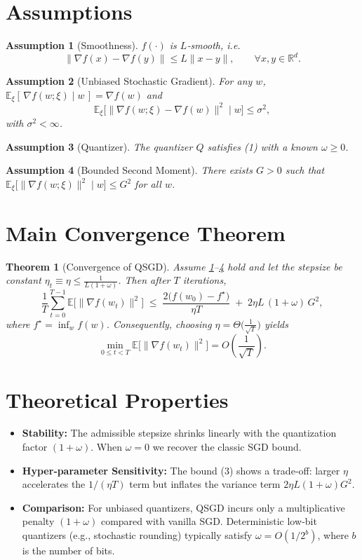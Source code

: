 \documentclass{article}
\newtheorem{theorem}{Theorem}
\newtheorem{assumption}{Assumption}
\newcommand{\EE}{\mathbb{E}}
\newcommand{\RR}{\mathbb{R}}
\begin{document}
\newpage

\section*{Assumptions}
\begin{assumption}[Smoothness]\label{as:smooth}
$f(\cdot)$ is $L$‑smooth, i.e.
\[
\|\nabla f(x)-\nabla f(y)\|\le L\|x-y\|,\qquad\forall x,y\in\RR^{d}.
\tag{A1}
\]
\end{assumption}
\begin{assumption}[Unbiased Stochastic Gradient]\label{as:unbiased}
For any $w$, $\EE_{\xi}[\,\nabla f(w;\xi)\mid w\,]=\nabla f(w)$ and
\[
\EE_{\xi}\!\big[\|\nabla f(w;\xi)-\nabla f(w)\|^{2}\mid w\big]\le\sigma^{2},
\tag{A2}
\]
with $\sigma^{2}<\infty$.
\end{assumption}
\begin{assumption}[Quantizer]\label{as:quant}
The quantizer $Q$ satisfies (1) with a known $\omega\ge0$.
\end{assumption}
\begin{assumption}[Bounded Second Moment]\label{as:bound}
There exists $G>0$ such that $\EE_{\xi}\!\big[\| \nabla f(w;\xi)\|^{2}\mid w\big]\le G^{2}$ for all $w$.
\end{assumption}

\section*{Main Convergence Theorem}
\begin{theorem}[Convergence of QSGD]\label{thm:main}
Assume \ref{as:smooth}–\ref{as:bound} hold and let the stepsize be constant $\eta_{t}\equiv\eta\le \frac{1}{L(1+\omega)}$. Then after $T$ iterations,
\[
\frac{1}{T}\sum_{t=0}^{T-1}\EE\!\big[\|\nabla f(w_{t})\|^{2}\big]
\;\le\;
\frac{2\big(f(w_{0})-f^{\star}\big)}{\eta T}
\;+\;
2\eta L\,(1+\omega) \,G^{2},
\tag{3}
\]
where $f^{\star}=\inf_{w}f(w)$. Consequently, choosing $\eta=\Theta\!\big(\frac{1}{\sqrt{T}}\big)$ yields
\[
\min_{0\le t<T}\EE\!\big[\|\nabla f(w_{t})\|^{2}\big]=O\!\left(\frac{1}{\sqrt{T}}\right).
\]
\end{theorem}

\section*{Theoretical Properties}
\begin{itemize}
\item \textbf{Stability:} The admissible stepsize shrinks linearly with the quantization factor $(1+\omega)$. When $\omega=0$ we recover the classic SGD bound.
\item \textbf{Hyper‑parameter Sensitivity:} The bound (3) shows a trade‑off: larger $\eta$ accelerates the $1/(\eta T)$ term but inflates the variance term $2\eta L(1+\omega)G^{2}$.
\item \textbf{Comparison:} For unbiased quantizers, QSGD incurs only a multiplicative penalty $(1+\omega)$ compared with vanilla SGD. Deterministic low‑bit quantizers (e.g., stochastic rounding) typically satisfy $\omega=O(1/2^{b})$, where $b$ is the number of bits.
\end{itemize}
\end{document}
